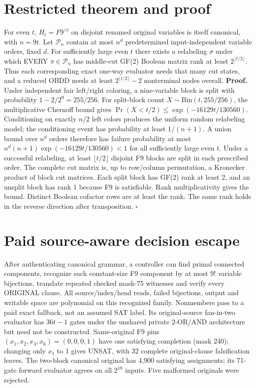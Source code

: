 \documentclass[11pt]{article}
\begin{document}
\section{Restricted theorem and proof}
For even $t$, $H_t=F9^{\wedge t}$ on disjoint renamed original variables is itself canonical, with $n=9t$. Let $\mathcal P_n$ contain at most $n^d$ predetermined input-independent variable orders, fixed $d$. For sufficiently large even $t$ there exists a relabeling $\sigma$ under which EVERY $\pi\in\mathcal P_n$ has middle-cut GF(2) Boolean matrix rank at least $2^{\lfloor t/2\rfloor}$. Thus each corresponding exact one-way evaluator needs that many cut states, and a reduced OBDD needs at least $2^{\lfloor t/2\rfloor}-2$ nonterminal nodes overall.
\noindent\textbf{Proof.} Under independent fair left/right coloring, a nine-variable block is split with probability $1-2/2^9=255/256$. For split-block count $X\sim\mathrm{Bin}(t,255/256)$, the multiplicative Chernoff bound gives $\Pr(X<t/2)\le\exp(-16129t/130560)$. Conditioning on exactly $n/2$ left colors produces the uniform random relabeling model; the conditioning event has probability at least $1/(n+1)$. A union bound over $n^d$ orders therefore has failure probability at most $n^d(n+1)\exp(-16129t/130560)<1$ for all sufficiently large even $t$. Under a successful relabeling, at least $\lfloor t/2\rfloor$ disjoint F9 blocks are split in each prescribed order. The complete cut matrix is, up to row/column permutation, a Kronecker product of block cut matrices. Each split block has GF(2) rank at least 2, and an unsplit block has rank 1 because F9 is satisfiable. Rank multiplicativity gives the bound. Distinct Boolean cofactor rows are at least the rank. The same rank holds in the reverse direction after transposition. \hfill$\square$
\section{Paid source-aware decision escape}
After authenticating canonical grammar, a controller can find primal connected components, recognize each constant-size F9 component by at most $9!$ variable bijections, translate repeated checked mask-75 witnesses and verify every ORIGINAL clause. All source/index/head reads, failed bijections, output and writable space are polynomial on this recognized family. Nonmembers pass to a paid exact fallback, not an assumed SAT label. Its original-source fan-in-two evaluator has $36t-1$ gates under the unshared private 2-OR/AND architecture but need not be constructed.
Same-original F9 pins $(x_1,x_2,x_3,x_6)=(0,0,0,1)$ have one satisfying completion (mask 240); changing only $x_1$ to 1 gives UNSAT, with 32 complete original-clause falsification leaves. The two-block canonical original has 4,900 satisfying assignments; its 71-gate forward evaluator agrees on all $2^{18}$ inputs. Five malformed originals were rejected.
\end{document}
